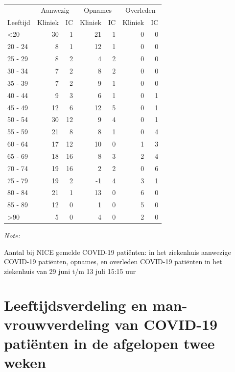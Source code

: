 \documentclass[
  english,
  man,floatsintext]{apa6}
\begin{document}
\begin{table}
\centering\begingroup\fontsize{10}{12}\selectfont

\begin{threeparttable}
\begin{tabular}{lrrrrrr}
\toprule
\multicolumn{1}{c}{ } & \multicolumn{2}{c}{Aanwezig} & \multicolumn{2}{c}{Opnames} & \multicolumn{2}{c}{Overleden} \\
\cmidrule(l{3pt}r{3pt}){2-3} \cmidrule(l{3pt}r{3pt}){4-5} \cmidrule(l{3pt}r{3pt}){6-7}
Leeftijd & Kliniek & IC & Kliniek & IC & Kliniek & IC\\
\midrule
<20 & 30 & 1 & 21 & 1 & 0 & 0\\
20 - 24 & 8 & 1 & 12 & 1 & 0 & 0\\
25 - 29 & 8 & 2 & 4 & 2 & 0 & 0\\
30 - 34 & 7 & 2 & 8 & 2 & 0 & 0\\
35 - 39 & 7 & 2 & 9 & 1 & 0 & 0\\
40 - 44 & 9 & 3 & 6 & 1 & 0 & 1\\
45 - 49 & 12 & 6 & 12 & 5 & 0 & 1\\
50 - 54 & 30 & 12 & 9 & 4 & 0 & 1\\
55 - 59 & 21 & 8 & 8 & 1 & 0 & 4\\
60 - 64 & 17 & 12 & 10 & 0 & 1 & 3\\
65 - 69 & 18 & 16 & 8 & 3 & 2 & 4\\
70 - 74 & 19 & 16 & 2 & 2 & 0 & 6\\
75 - 79 & 19 & 2 & -1 & 4 & 3 & 1\\
80 - 84 & 21 & 1 & 13 & 0 & 6 & 0\\
85 - 89 & 12 & 0 & 1 & 0 & 5 & 0\\
>90 & 5 & 0 & 4 & 0 & 2 & 0\\
\bottomrule
\end{tabular}
\begin{tablenotes}
\item \textit{Note: } 
\item Aantal bij NICE gemelde COVID-19 patiënten: in het ziekenhuis aanwezige COVID-19 patiënten, opnames, en overleden COVID-19 patiënten in het ziekenhuis van 29 juni t/m 13 juli 15:15 uur
\end{tablenotes}
\end{threeparttable}
\endgroup{}
\end{table}

\newpage

\hypertarget{leeftijdsverdeling-en-man-vrouwverdeling-van-covid-19-patiuxebnten-in-de-afgelopen-twee-weken}{%
\section{Leeftijdsverdeling en man-vrouwverdeling van COVID-19 patiënten in de afgelopen twee weken}\label{leeftijdsverdeling-en-man-vrouwverdeling-van-covid-19-patiuxebnten-in-de-afgelopen-twee-weken}}
\end{document}
